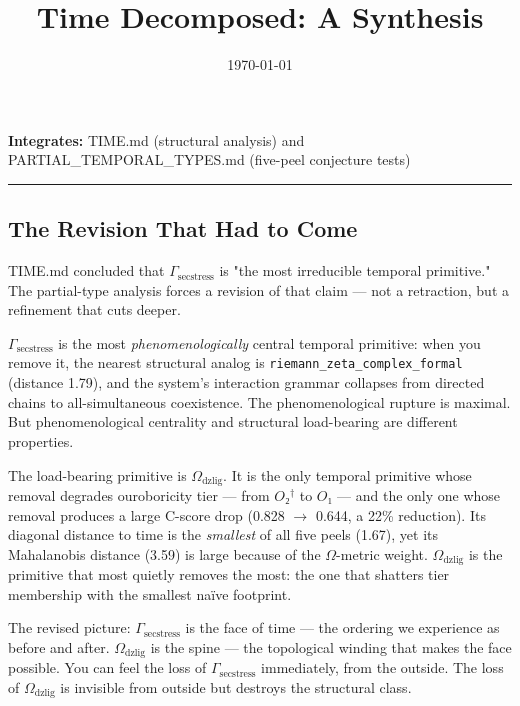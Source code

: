 \documentclass[12pt,a4paper]{article}
\begin{document}
\title{Time Decomposed: A Synthesis}
\date{\today}

\maketitle

\textbf{Integrates:} TIME.md (structural analysis) and PARTIAL\_TEMPORAL\_TYPES.md (five-peel conjecture tests)

\begin{center}
\rule{0.5\textwidth}{0.4pt}
\end{center}

\subsection{The Revision That Had to Come}

TIME.md concluded that $\Gamma_{\text{secstress}}$ is "the most irreducible temporal primitive." The partial-type analysis forces a revision of that claim --- not a retraction, but a refinement that cuts deeper.

$\Gamma_{\text{secstress}}$ is the most \emph{phenomenologically} central temporal primitive: when you remove it, the nearest structural analog is \texttt{riemann\_zeta\_complex\_formal} (distance 1.79), and the system's interaction grammar collapses from directed chains to all-simultaneous coexistence. The phenomenological rupture is maximal. But phenomenological centrality and structural load-bearing are different properties.

The load-bearing primitive is $\Omega_{\text{dzlig}}$. It is the only temporal primitive whose removal degrades ouroboricity tier --- from $O₂^\dagger$ to $O₁$ --- and the only one whose removal produces a large C-score drop (0.828 $\rightarrow$ 0.644, a 22\% reduction). Its diagonal distance to time is the \emph{smallest} of all five peels (1.67), yet its Mahalanobis distance (3.59) is large because of the $\Omega$-metric weight. $\Omega_{\text{dzlig}}$ is the primitive that most quietly removes the most: the one that shatters tier membership with the smallest naïve footprint.

The revised picture: $\Gamma_{\text{secstress}}$ is the face of time --- the ordering we experience as before and after. $\Omega_{\text{dzlig}}$ is the spine --- the topological winding that makes the face possible. You can feel the loss of $\Gamma_{\text{secstress}}$ immediately, from the outside. The loss of $\Omega_{\text{dzlig}}$ is invisible from outside but destroys the structural class.
\end{document}
